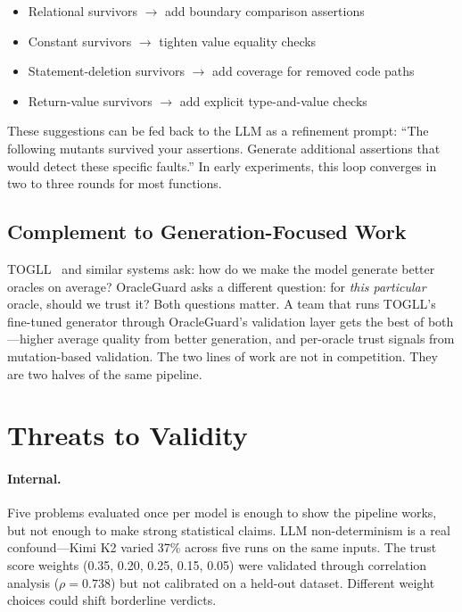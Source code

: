 \documentclass[conference]{IEEEtran}
\begin{document}
\begin{itemize}
\item Relational survivors $\rightarrow$ add boundary comparison assertions
\item Constant survivors $\rightarrow$ tighten value equality checks
\item Statement-deletion survivors $\rightarrow$ add coverage for removed code paths
\item Return-value survivors $\rightarrow$ add explicit type-and-value checks
\end{itemize}

These suggestions can be fed back to the LLM as a refinement prompt: ``The following mutants survived your assertions. Generate additional assertions that would detect these specific faults.'' In early experiments, this loop converges in two to three rounds for most functions.

\subsection{Complement to Generation-Focused Work}

TOGLL~\cite{hossain2024togll} and similar systems ask: how do we make the model generate better oracles on average? OracleGuard asks a different question: for \emph{this particular} oracle, should we trust it? Both questions matter. A team that runs TOGLL's fine-tuned generator through OracleGuard's validation layer gets the best of both---higher average quality from better generation, and per-oracle trust signals from mutation-based validation. The two lines of work are not in competition. They are two halves of the same pipeline.

\section{Threats to Validity}

\paragraph{Internal.} Five problems evaluated once per model is enough to show the pipeline works, but not enough to make strong statistical claims. LLM non-determinism is a real confound---Kimi K2 varied 37\% across five runs on the same inputs. The trust score weights (0.35, 0.20, 0.25, 0.15, 0.05) were validated through correlation analysis ($\rho = 0.738$) but not calibrated on a held-out dataset. Different weight choices could shift borderline verdicts.
\end{document}
